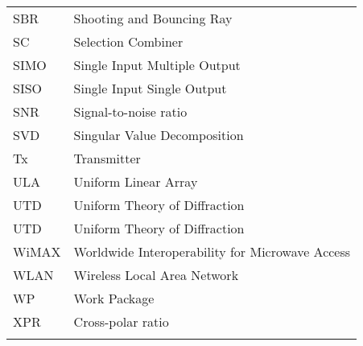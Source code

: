 \begin{tabular}{ll}
\\

SBR & Shooting and Bouncing Ray\\

SC & Selection Combiner\\

SIMO & Single Input Multiple Output\\

SISO & Single Input Single Output\\

SNR & Signal-to-noise ratio\\

SVD & Singular Value Decomposition\\

Tx & Transmitter\\

ULA & Uniform Linear Array \\


UTD & Uniform Theory of Diffraction\\


UTD & Uniform Theory of Diffraction\\

WiMAX & Worldwide Interoperability for Microwave Access\\

WLAN & Wireless Local Area Network\\

WP & Work Package\\

XPR & Cross-polar ratio\\



\\
\end{tabular}
\fi

\newpage

\setcounter{page}{1} %
\pagestyle{fancy}
